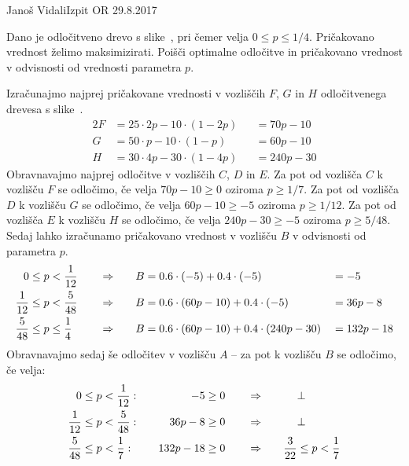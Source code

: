 \begin{naloga}{Janoš Vidali}{Izpit OR 29.8.2017}
\begin{vprasanje}
Dano je odločitveno drevo s slike~\fig,
pri čemer velja $0 \le p \le 1/4$.
Pričakovano vred\-nost želimo maksimizirati.
Poišči optimalne odločitve in pričakovano vrednost
v odvisnosti od vrednosti parametra $p$.

\begin{slika}
\pgfslika
{}
\end{slika}
\end{vprasanje}

\begin{odgovor}
Izračunajmo najprej pričakovane vrednosti
v vozliščih $F$, $G$ in $H$ odločitvenega drevesa s slike~\fig.
\begin{alignat*}{2}
F &= 25 \cdot 2p - 10 \cdot (1-2p) &&= 70p - 10 \\
G &= 50 \cdot p - 10 \cdot (1-p) &&= 60p - 10 \\
H &= 30 \cdot 4p - 30 \cdot (1-4p) &&= 240p - 30
\end{alignat*}
Obravnavajmo najprej odločitve v vozliščih $C$, $D$ in $E$.
Za pot od vozlišča $C$ k vozlišču $F$ se odločimo,
če velja $70p - 10 \ge 0$ oziroma $p \ge 1/7$.
Za pot od vozlišča $D$ k vozlišču $G$ se odločimo,
če velja $60p - 10 \ge -5$ oziroma $p \ge 1/12$.
Za pot od vozlišča $E$ k vozlišču $H$ se odločimo,
če velja $240p - 30 \ge -5$ oziroma $p \ge 5/48$.
Sedaj lahko izračunamo pričakovano vrednost v vozlišču $B$
v odvisnosti od parametra $p$.
\begin{alignat*}{4}
0 &\le p < {1 \over 12} &\quad&\Rightarrow\quad
& B &= 0.6 \cdot (-5) + 0.4 \cdot (-5) &&= -5 \\
{1 \over 12} &\le p < {5 \over 48} &\quad&\Rightarrow\quad
& B &= 0.6 \cdot (60p - 10) + 0.4 \cdot (-5) &&= 36p - 8 \\
{5 \over 48} &\le p \le {1 \over 4} &\quad&\Rightarrow\quad
& B &= 0.6 \cdot (60p - 10) + 0.4 \cdot (240p - 30) &&= 132p - 18
\end{alignat*}
Obravnavajmo sedaj še odločitev v vozlišču $A$
-- za pot k vozlišču $B$ se odločimo, če velja:
\begin{alignat*}{4}
0 &\le p < {1 \over 12}: &\quad -5 &\ge 0 &\quad&\Rightarrow\quad &&\bot \\
{1 \over 12} &\le p < {5 \over 48}: &\quad 36p - 8 &\ge 0
&\quad&\Rightarrow\quad &&\bot \\
{5 \over 48} &\le p < {1 \over 7}: &\quad 132p - 18 &\ge 0
&\quad&\Rightarrow\quad & {3 \over 22} &\le p < {1 \over 7} \\

\end{alignat*}
\end{odgovor}
\end{naloga}
